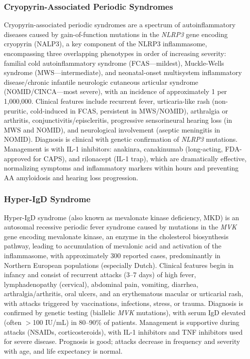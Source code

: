 \subsubsection{Cryopyrin-Associated Periodic Syndromes}
Cryopyrin-associated periodic syndromes are a spectrum of autoinflammatory diseases caused by gain-of-function mutations in the \textit{NLRP3} gene encoding cryopyrin (NALP3), a key component of the NLRP3 inflammasome, encompassing three overlapping phenotypes in order of increasing severity: familial cold autoinflammatory syndrome (FCAS---mildest), Muckle-Wells syndrome (MWS---intermediate), and neonatal-onset multisystem inflammatory disease/chronic infantile neurologic cutaneous articular syndrome (NOMID/CINCA---most severe), with an incidence of approximately 1 per 1,000,000. Clinical features include recurrent fever, urticaria-like rash (non-pruritic, cold-induced in FCAS, persistent in MWS/NOMID), arthralgia or arthritis, conjunctivitis/episcleritis, progressive sensorineural hearing loss (in MWS and NOMID), and neurological involvement (aseptic meningitis in NOMID). Diagnosis is clinical with genetic confirmation of \textit{NLRP3} mutations. Management is with IL-1 inhibitors: anakinra, canakinumab (long-acting, FDA-approved for CAPS), and rilonacept (IL-1 trap), which are dramatically effective, normalizing symptoms and inflammatory markers within hours and preventing AA amyloidosis and hearing loss progression.

\subsubsection{Hyper-IgD Syndrome}
Hyper-IgD syndrome (also known as mevalonate kinase deficiency, MKD) is an autosomal recessive periodic fever syndrome caused by mutations in the \textit{MVK} gene encoding mevalonate kinase, an enzyme in the cholesterol biosynthesis pathway, leading to accumulation of mevalonic acid and activation of the inflammasome, with approximately 300 reported cases, predominantly in Northern European populations (especially Dutch). Clinical features begin in infancy and consist of recurrent attacks (3--7 days) of high fever, lymphadenopathy (cervical), abdominal pain, vomiting, diarrhea, arthralgia/arthritis, oral ulcers, and an erythematous macular or urticarial rash, with attacks triggered by vaccinations, infections, stress, or trauma. Diagnosis is confirmed by genetic testing (biallelic \textit{MVK} mutations), with serum IgD elevated (often $>$100 IU/mL) in 80--90\% of patients. Management is supportive during attacks (NSAIDs, corticosteroids), with IL-1 inhibitors and TNF inhibitors used for severe disease. Prognosis is good; attacks decrease in frequency and severity with age, and life expectancy is normal.

